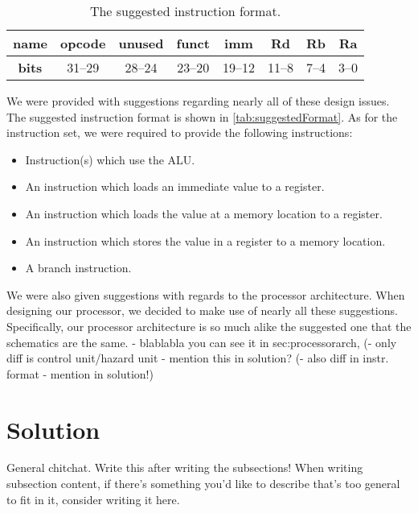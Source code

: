 \documentclass[11pt]{article}
\begin{document}
\begin{table}[htbp]
  \centering
  \begin{tabular}{|c|c|c|c|c|c|c|c|}
    \hline
    {\bf name} & opcode & unused & funct & imm & Rd & Rb & Ra \\ \hline
    {\bf bits} & 31--29 & 28--24 & 23--20 & 19--12 & 11--8 & 7--4 & 3--0 \\ \hline
  \end{tabular}
  \caption{The suggested instruction format.}
  \label{tab:suggestedFormat}
\end{table}

We were provided with suggestions regarding nearly all of these design
issues. The suggested instruction format is shown in
\autoref{tab:suggestedFormat}. As for the instruction set, we
were required to provide the following instructions:
\begin{itemize}
\item Instruction(s) which use the ALU.
\item An instruction which loads an immediate value to a register.
\item An instruction which loads the value at a memory location to a register.
\item An instruction which stores the value in a register to a memory location.
\item A branch instruction.
\end{itemize}

We were also given suggestions with regards to the processor
architecture. When designing our processor, we decided to make use of
nearly all these suggestions. Specifically, our processor architecture
is so much alike the suggested one that the schematics are the same. 
- blablabla you can see it in sec:processorarch, 
(- only diff is control unit/hazard unit - mention this in solution? 
(- also diff in instr. format - mention in solution!)


\section{Solution}
\label{sec:solution} General chitchat. Write this after writing the
subsections!  When writing subsection content, if there's something
you'd like to describe that's too general to fit in it, consider
writing it here.
\end{document}
